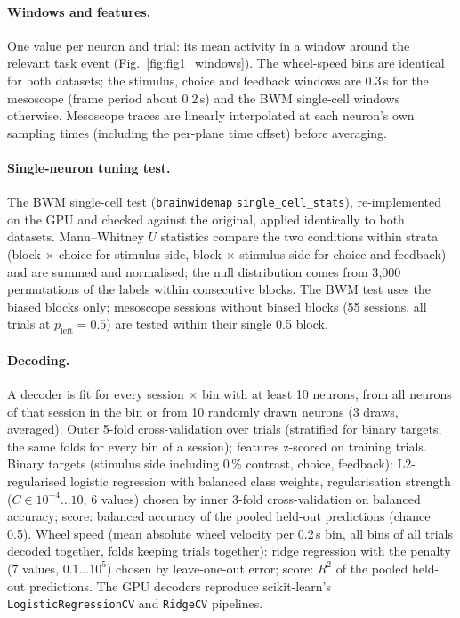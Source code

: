 \documentclass[10pt]{article}
\begin{document}
\paragraph{Windows and features.}
One value per neuron and trial: its mean activity in a window around the relevant task event (Fig.~\ref{fig:fig1_windows}). The wheel-speed bins are identical for both datasets; the stimulus, choice and feedback windows are 0.3\,s for the mesoscope (frame period about 0.2\,s) and the BWM single-cell windows otherwise. Mesoscope traces are linearly interpolated at each neuron's own sampling times (including the per-plane time offset) before averaging.

\paragraph{Single-neuron tuning test.}
The BWM single-cell test (\texttt{brainwidemap} \texttt{single\_cell\_stats}), re-implemented on the GPU and checked against the original, applied identically to both datasets. Mann--Whitney $U$ statistics compare the two conditions within strata (block $\times$ choice for stimulus side, block $\times$ stimulus side for choice and feedback) and are summed and normalised; the null distribution comes from 3{,}000 permutations of the labels within consecutive blocks. The BWM test uses the biased blocks only; mesoscope sessions without biased blocks (55 sessions, all trials at $p_\text{left}=0.5$) are tested within their single 0.5 block.

\paragraph{Decoding.}
A decoder is fit for every session $\times$ bin with at least 10 neurons, from all neurons of that session in the bin or from 10 randomly drawn neurons (3 draws, averaged). Outer 5-fold cross-validation over trials (stratified for binary targets; the same folds for every bin of a session); features z-scored on training trials. Binary targets (stimulus side including 0\,\% contrast, choice, feedback): L2-regularised logistic regression with balanced class weights, regularisation strength ($C \in 10^{-4}\ldots10$, 6 values) chosen by inner 3-fold cross-validation on balanced accuracy; score: balanced accuracy of the pooled held-out predictions (chance 0.5). Wheel speed (mean absolute wheel velocity per 0.2\,s bin, all bins of all trials decoded together, folds keeping trials together): ridge regression with the penalty (7 values, $0.1\ldots10^5$) chosen by leave-one-out error; score: $R^2$ of the pooled held-out predictions. The GPU decoders reproduce scikit-learn's \texttt{LogisticRegressionCV} and \texttt{RidgeCV} pipelines.
\end{document}

